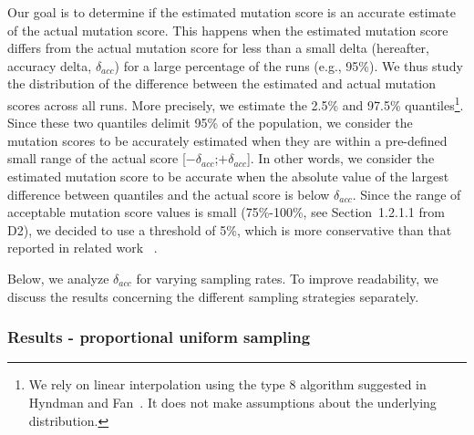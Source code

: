 %

%
Our goal is to determine if the estimated mutation score is an accurate estimate of the actual mutation score.
This happens when the estimated mutation score differs from the actual mutation score for less than a small delta (hereafter, accuracy delta, $\delta_{acc}$) for a large percentage of the runs (e.g., 95\%).
We thus study the distribution of the difference between the estimated and actual mutation scores across all runs. More precisely, we estimate the 2.5\% and 97.5\% quantiles\footnote{We rely on linear interpolation using the type 8 
algorithm suggested in Hyndman and Fan~\cite{Hyndman1996}. It does not make assumptions about the underlying distribution.}.
Since these two quantiles delimit 95\% of the population,
we consider the mutation scores to be accurately estimated when they are within a pre-defined small range of the actual score [$-\delta_{acc}$;$+\delta_{acc}$].
In other words, we consider the estimated mutation score to be accurate when 
the absolute value of the largest difference between quantiles and the actual score is below $\delta_{acc}$.
Since the range of acceptable mutation score values is small (75\%-100\%, see Section~1.2.1.1 from D2), we decided to use a threshold of 5\%, which is more conservative than that reported in related work ~\cite{gopinath2015hard}. 

Below, we analyze $\delta_{acc}$ for varying sampling rates. To improve readability, we discuss the results concerning the different sampling strategies separately.




\subsubsection{Results - proportional uniform sampling}

